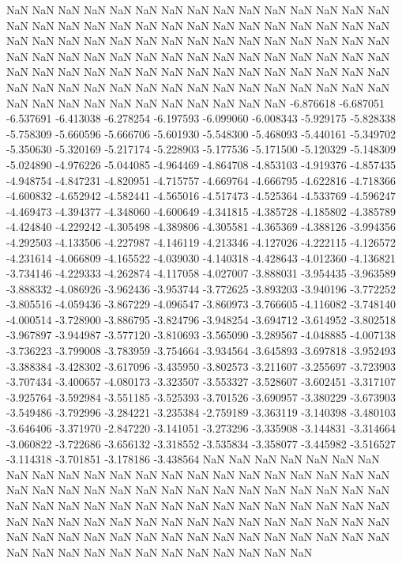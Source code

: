 NaN
NaN
NaN
NaN
NaN
NaN
NaN
NaN
NaN
NaN
NaN
NaN
NaN
NaN
NaN
NaN
NaN
NaN
NaN
NaN
NaN
NaN
NaN
NaN
NaN
NaN
NaN
NaN
NaN
NaN
NaN
NaN
NaN
NaN
NaN
NaN
NaN
NaN
NaN
NaN
NaN
NaN
NaN
NaN
NaN
NaN
NaN
NaN
NaN
NaN
NaN
NaN
NaN
NaN
NaN
NaN
NaN
NaN
NaN
NaN
NaN
NaN
NaN
NaN
NaN
NaN
NaN
NaN
NaN
NaN
NaN
NaN
NaN
NaN
NaN
NaN
NaN
NaN
NaN
NaN
NaN
NaN
NaN
NaN
NaN
NaN
NaN
NaN
NaN
NaN
NaN
NaN
NaN
NaN
NaN
NaN
NaN
NaN
NaN
NaN
NaN
-6.876618
-6.687051
-6.537691
-6.413038
-6.278254
-6.197593
-6.099060
-6.008343
-5.929175
-5.828338
-5.758309
-5.660596
-5.666706
-5.601930
-5.548300
-5.468093
-5.440161
-5.349702
-5.350630
-5.320169
-5.217174
-5.228903
-5.177536
-5.171500
-5.120329
-5.148309
-5.024890
-4.976226
-5.044085
-4.964469
-4.864708
-4.853103
-4.919376
-4.857435
-4.948754
-4.847231
-4.820951
-4.715757
-4.669764
-4.666795
-4.622816
-4.718366
-4.600832
-4.652942
-4.582441
-4.565016
-4.517473
-4.525364
-4.533769
-4.596247
-4.469473
-4.394377
-4.348060
-4.600649
-4.341815
-4.385728
-4.185802
-4.385789
-4.424840
-4.229242
-4.305498
-4.389806
-4.305581
-4.365369
-4.388126
-3.994356
-4.292503
-4.133506
-4.227987
-4.146119
-4.213346
-4.127026
-4.222115
-4.126572
-4.231614
-4.066809
-4.165522
-4.039030
-4.140318
-4.428643
-4.012360
-4.136821
-3.734146
-4.229333
-4.262874
-4.117058
-4.027007
-3.888031
-3.954435
-3.963589
-3.888332
-4.086926
-3.962436
-3.953744
-3.772625
-3.893203
-3.940196
-3.772252
-3.805516
-4.059436
-3.867229
-4.096547
-3.860973
-3.766605
-4.116082
-3.748140
-4.000514
-3.728900
-3.886795
-3.824796
-3.948254
-3.694712
-3.614952
-3.802518
-3.967897
-3.944987
-3.577120
-3.810693
-3.565090
-3.289567
-4.048885
-4.007138
-3.736223
-3.799008
-3.783959
-3.754664
-3.934564
-3.645893
-3.697818
-3.952493
-3.388384
-3.428302
-3.617096
-3.435950
-3.802573
-3.211607
-3.255697
-3.723903
-3.707434
-3.400657
-4.080173
-3.323507
-3.553327
-3.528607
-3.602451
-3.317107
-3.925764
-3.592984
-3.551185
-3.525393
-3.701526
-3.690957
-3.380229
-3.673903
-3.549486
-3.792996
-3.284221
-3.235384
-2.759189
-3.363119
-3.140398
-3.480103
-3.646406
-3.371970
-2.847220
-3.141051
-3.273296
-3.335908
-3.144831
-3.314664
-3.060822
-3.722686
-3.656132
-3.318552
-3.535834
-3.358077
-3.445982
-3.516527
-3.114318
-3.701851
-3.178186
-3.438564
NaN
NaN
NaN
NaN
NaN
NaN
NaN
NaN
NaN
NaN
NaN
NaN
NaN
NaN
NaN
NaN
NaN
NaN
NaN
NaN
NaN
NaN
NaN
NaN
NaN
NaN
NaN
NaN
NaN
NaN
NaN
NaN
NaN
NaN
NaN
NaN
NaN
NaN
NaN
NaN
NaN
NaN
NaN
NaN
NaN
NaN
NaN
NaN
NaN
NaN
NaN
NaN
NaN
NaN
NaN
NaN
NaN
NaN
NaN
NaN
NaN
NaN
NaN
NaN
NaN
NaN
NaN
NaN
NaN
NaN
NaN
NaN
NaN
NaN
NaN
NaN
NaN
NaN
NaN
NaN
NaN
NaN
NaN
NaN
NaN
NaN
NaN
NaN
NaN
NaN
NaN
NaN
NaN
NaN
